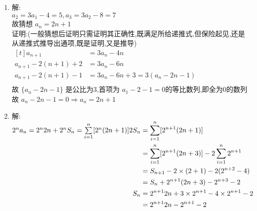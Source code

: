 \documentclass[class=ctexart,crop=false]{standalone}
\begin{document}
\begin{enumerate}[label=(\arabic*)]
    \item 解:\\
    $a_2=3a_1-4=5,a_3=3a_2-8=7$\\
    故猜想 ${a_n}=2n+1$\\
    证明:(一般猜想后证明只需证明其正确性,既满足所给递推式,但保险起见,还是从递推式推导出通项,既是证明,又是推导)\\
    $\begin{aligned}[t]
        a_{n+1}&=3a_n-4n\\
        a_{n+1}-2(n+1)+2&=3a_n-6n\\
        a_{n+1}-2(n+1)-1&=3a_n-6n+3=3(a_n-2n-1)\\
    \end{aligned}$\\
故 $\{a_n-2n-1\}$ 是公比为3,首项为 $a_1-2-1=0$的等比数列,即全为0的数列\\
故 ${a_n-2n-1}=0\Rightarrow a_n=2n+1$\\
    \item 解:\\
    ${2^na_n}=2^n2n+2^n \\
    S_n=\sum\limits_{i=1}^{n}[2^n(2n+1)]\\
    \begin{aligned}[t]
        2S_n&=\sum\limits_{i=1}^{n}[2^{n+1}(2n+1)]\\
        &=\sum\limits_{i=1}^{n}[2^{n+1}(2n+3)]-2\sum\limits_{i=1}^{n}2^{n+1}\\
        &=S_{n+1}-2\times (2+1)-2(2^{n+2}-4)\\
        &=S_n+2^{n+1}(2n+3)-2^{n+3}-2\\
    S_n&=2^{n+1}2n+3\times 2^{n+1}-4\times 2^{n+1}-2\\
    &=2^{n+1}2n-2^{n+1}-2\\
    \end{aligned}$\\
\end{enumerate}
\end{document}
